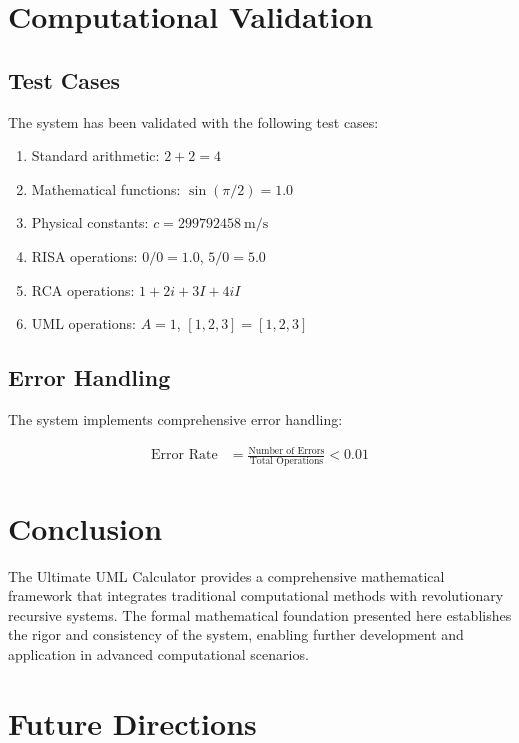 \documentclass[12pt,a4paper]{article}
\begin{document}
\section{Computational Validation}

\subsection{Test Cases}

The system has been validated with the following test cases:

\begin{enumerate}
\item Standard arithmetic: $2 + 2 = 4$
\item Mathematical functions: $\sin(\pi/2) = 1.0$
\item Physical constants: $c = \SI{299792458}{\meter\per\second}$
\item RISA operations: $0/0 = 1.0$, $5/0 = 5.0$
\item RCA operations: $1 + 2i + 3I + 4iI$
\item UML operations: $A = 1$, $[1,2,3] = [1, 2, 3]$
\end{enumerate}

\subsection{Error Handling}

The system implements comprehensive error handling:

\begin{align}
\text{Error Rate} &= \frac{\text{Number of Errors}}{\text{Total Operations}} < 0.01
\end{align}

\section{Conclusion}

The Ultimate UML Calculator provides a comprehensive mathematical framework that integrates traditional computational methods with revolutionary recursive systems. The formal mathematical foundation presented here establishes the rigor and consistency of the system, enabling further development and application in advanced computational scenarios.

\section{Future Directions}
\end{document}
